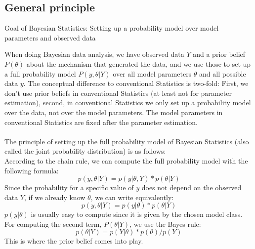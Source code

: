 \documentclass{article}
\begin{document}
\subsection{General principle}
Goal of Bayesian Statistics: Setting up a probability model over model parameters and observed data

When doing Bayesian data analysis, we have observed data $Y$ and a prior belief $P(\theta)$ about the mechanism that generated the data, and we use those to set up a full probability model $P(y,\theta|Y)$ over all model parameters $\theta$ and all possible data $y$. The conceptual difference to conventional Statistics is two-fold: First, we don't use prior beliefs in conventional Statistics (at least not for parameter estimation), second, in conventional Statistics we only set up a probability model over the data, not over the model parameters. The model parameters in conventional Statistics are fixed after the parameter estimation.
\\
\\
The principle of setting up the full probability model of Bayesian Statistics (also called the joint probability distribution) is as follows:
\\
According to the chain rule, we can compute the full probability model with the following formula:
\begin{equation}
p(y,\theta|Y) = p(y|\theta,Y) * p(\theta|Y)
\end{equation}
Since the probability for a specific value of $y$ does not depend on the observed data $Y$, if we already know $\theta$, we can write equivalently:
\begin{equation}
p(y,\theta|Y) = p(y|\theta) * p(\theta|Y)
\end{equation}
$p(y|\theta)$ is usually easy to compute since it is given by the chosen model class. For computing the second term, $P(\theta|Y)$, we use the Bayes rule:
\begin{equation}
p(\theta|Y) = p(Y|\theta) * p(\theta) / p(Y)
\end{equation}
This is where the prior belief comes into play.
\end{document}
